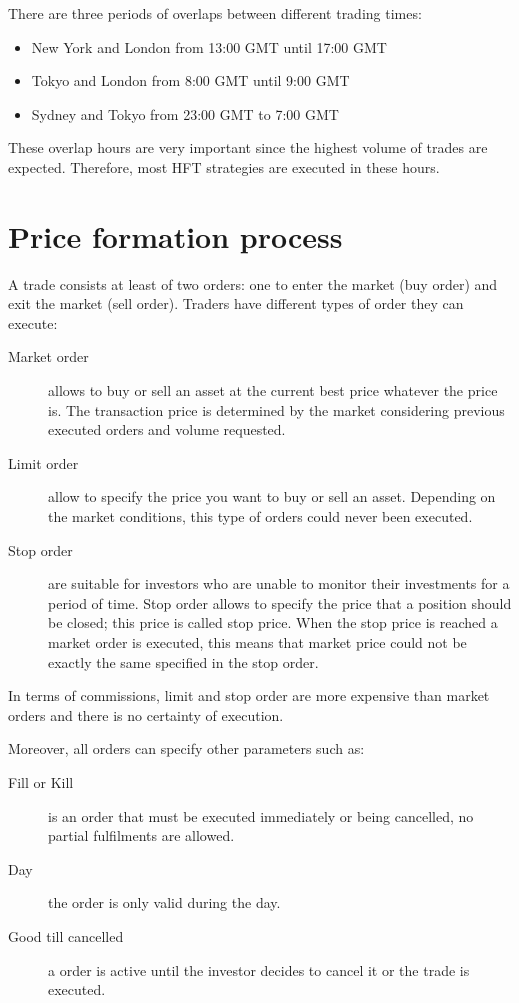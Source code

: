 There are three periods of overlaps between different trading times:

\begin{itemize}
\item New York and London from 13:00 GMT until 17:00 GMT
\item Tokyo and London from 8:00 GMT until 9:00 GMT
\item Sydney and Tokyo from 23:00 GMT to 7:00 GMT 
\end{itemize}

These overlap hours are very important since the highest volume of trades are
expected. Therefore, most HFT strategies are executed in these hours.

\section{Price formation process}

A trade consists at least of two orders: one to enter the market (buy order) and
exit the market (sell order). Traders have different types of order they can
execute:

\begin{description}
\item[Market order] allows to buy or sell an asset at the current best price
whatever the price is. The transaction price is determined by the market
considering previous executed orders and volume requested.
\item[Limit order] allow to specify the price you want to buy or sell an asset.
Depending on the market conditions, this type of orders could never been executed.
\item[Stop order] are suitable for investors who are unable to monitor their
investments for a period of time. Stop order allows to specify the price that a
position should be closed; this price is called stop price. When the stop price
is reached a market order is executed, this means that market price could not be
exactly the same specified in the stop order.
\end{description}

In terms of commissions, limit and stop order are more expensive than market orders and
there is no certainty of execution.

Moreover, all orders can specify other parameters such as: 

\begin{description}
\item[Fill or Kill] is an order that must be executed immediately or being
cancelled, no partial fulfilments are allowed. 
\item[Day] the order is only valid during the day.
\item[Good till cancelled] a order is active until the investor decides to cancel
it or the trade is executed.
\end{description}

